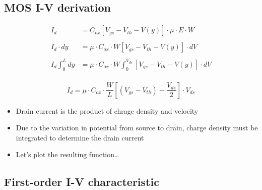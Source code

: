 \documentclass[11pt]{article}
\providecommand{\tightlist}{%
      \setlength{\itemsep}{0pt}\setlength{\parskip}{0pt}}
\begin{document}
    \hypertarget{mos-i-v-derivation}{%
\subsection{MOS I-V derivation}\label{mos-i-v-derivation}}

    \begin{align}
I_d &= C_{ox}[V_{gs} - V_{th} - V(y)] \cdot \mu \cdot E \cdot W \\
\\
I_d \cdot dy &= \mu \cdot C_{ox} \cdot W [V_{gs} - V_{th} - V(y)]\cdot dV \\
\\
I_d \int_0^L{dy} &= \mu \cdot C_{ox} \cdot W  \int_0^{V_{ds}}{[V_{gs} - V_{th} - V(y)]\cdot dV}\\
\end{align}

\[\boxed{I_d = \mu \cdot C_{ox} \cdot \dfrac{W}{L} {\left[(V_{gs} - V_{th}) - \dfrac{V_{ds}}{2}\right]\cdot V_{ds}}} \]

\begin{itemize}
\tightlist
\item
  Drain current is the product of chrage density and velocity
\item
  Due to the variation in potential from source to drain, charge density
  must be integrated to determine the drain current
\item
  Let's plot the resulting function\ldots{}
\end{itemize}

    \hypertarget{first-order-i-v-characteristic}{%
\subsection{First-order I-V
characteristic}\label{first-order-i-v-characteristic}}
\end{document}
